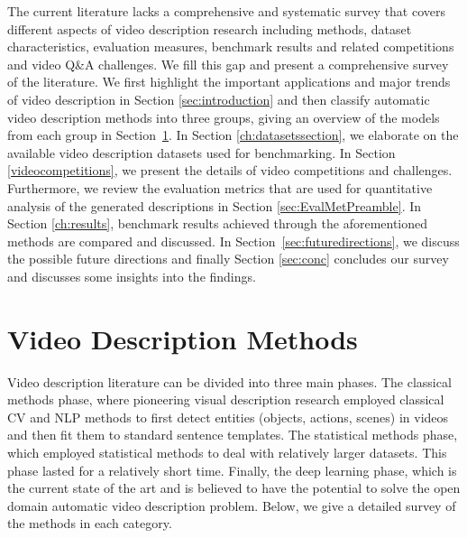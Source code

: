 \documentclass[10pt,journal,compsoc]{IEEEtran}
\begin{document}
The current literature lacks a comprehensive and systematic survey that covers different aspects of video description research including methods, dataset characteristics, evaluation measures, benchmark results and related competitions and video Q\&A challenges. We fill this gap and present a comprehensive survey of the literature. We first highlight the important applications and major trends of video description in Section \ref{sec:introduction} and then classify automatic video description methods into three groups, giving an overview of the models from each group in Section~\ref{sec:Methods}. In Section \ref{ch:datasetssection}, we elaborate on the available video description datasets used for benchmarking. In Section \ref{videocompetitions}, we present the details of video competitions and challenges. Furthermore, we review the evaluation metrics that are used for quantitative analysis of the generated descriptions in Section \ref{sec:EvalMetPreamble}. In Section \ref{ch:results}, benchmark results achieved through the aforementioned methods are compared and discussed. In Section~\ref{sec:futuredirections}, we discuss the possible future directions and finally Section \ref{sec:conc} concludes our survey and discusses some insights into the findings.
\vspace{-3mm}
\section{Video Description Methods}
\label{sec:Methods}
Video description literature can be divided into three main phases. The classical methods phase, where pioneering visual description research employed classical CV and NLP methods to first detect entities (objects, actions, scenes) in videos and then fit them to standard sentence templates. The statistical methods phase, which employed statistical methods to deal with relatively larger datasets. This phase lasted for a relatively short time.  Finally, the deep learning phase, which is the current state of the art and is believed to have the potential to solve the open domain automatic video description problem. Below, we give a detailed survey of the methods in each category.
\end{document}

